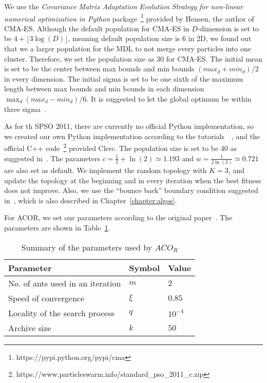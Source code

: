 We use the \textit{Covariance Matrix Adaptation Evolution Strategy for non-linear numerical optimization in Python} package~\footnote{https://pypi.python.org/pypi/cma} provided by Hensen, the author of CMA-ES.
Although the default population for CMA-ES in $D$-dimension is set to be $4 + \lfloor3\log(D)\rfloor$, meaning default population size is 6 in 2D,
we found out that we a larger population for the MDL to not merge every particles into one cluster.
Therefore, we set the population size as 30 for CMA-ES.
The initial mean is set to be the center between max bounds and min bounds $(max_d + min_d)/2$ in every dimension.
The initial sigma is set to be one sixth of the maximum length between max bounds and min bounds in each dimension $\max_{d}(max_d - min_d)/6$.
It is suggested to let the global optimum be within three sigma~\cite{Hansen:2006:CMA_ES_review}.

As for th SPSO 2011, there are currently no official Python implementation, 
so we created our own Python implementation according to the tutorials~\cite{Clerc:2012:SPSO2011}~\cite{Clerc:2007:randomTopology},
and the official C++ code~\footnote{https://www.particleswarm.info/standard\_pso\_2011\_c.zip} provided Clerc.
The population size is set to be 40 as suggested in~\cite{Clerc:2012:SPSO2011}.
The parameters $c = \frac{1}{2} + \ln(2) \simeq 1.193$ and $w = \frac{1}{2\ln(2)} \simeq 0.721$ are also set as default.
We implement the random topology with $K = 3$,
and update the topology at the beginning and in every iteration when the best fitness does not improve.
Also, we use the ``bounce back'' boundary condition suggested in~\cite{Clerc:2012:SPSO2011}, which is also described in Chapter~\ref{chapter:algos}.


For ACOR, we set our parameters according to the original paper~\cite{Socha:2008:ACOR}. 
The parameters are shown in Table~\ref{table:ACOR_parameters}.

\begin{table}%
\centering
\label{table:ACOR_parameters}
\begin{tabular}{lll}
\hline
Parameter                        & Symbol   & Value          \\ \hline
No. of ants used in an iteration & $m$      & $2$            \\
Speed of convergence             & $\xi$    & $0.85$         \\
Locality of the search process   & $q$      & $10^{-4}$      \\
Archive size                     & $k$      & $50$           \\ \hline
\end{tabular}
\caption{Summary of the parameters used by $ACO_R$}
\end{table}

